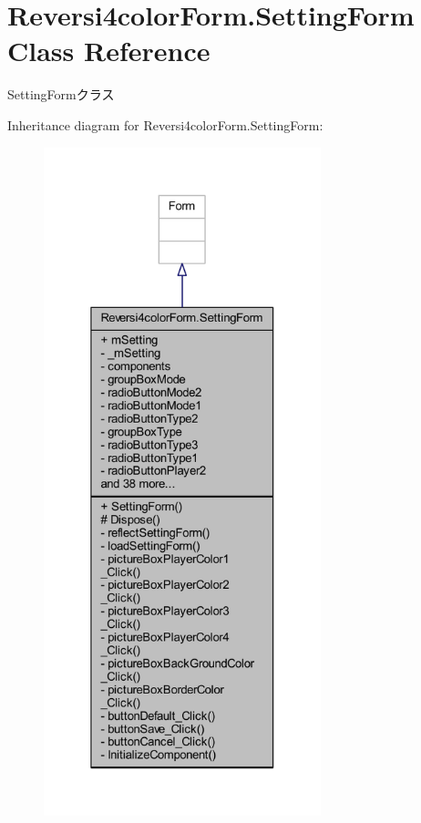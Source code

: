 \hypertarget{class_reversi4color_form_1_1_setting_form}{}\section{Reversi4color\+Form.\+Setting\+Form Class Reference}
\label{class_reversi4color_form_1_1_setting_form}


Setting\+Formクラス  




Inheritance diagram for Reversi4color\+Form.\+Setting\+Form\+:
\nopagebreak
\begin{figure}[H]
\begin{center}
\leavevmode
\includegraphics[height=550pt]{class_reversi4color_form_1_1_setting_form__inherit__graph}
\end{center}
\end{figure}


